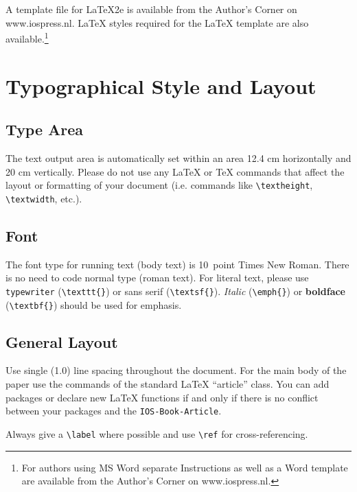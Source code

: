 \documentclass{IOS-Book-Article}
\begin{document}
A template file for \LaTeX2e is available from the Author's Corner on
www.iospress.nl. \LaTeX{} styles required for the \LaTeX{} template are also
available.\footnote{For authors using MS Word separate Instructions as well
as a Word template are available from the Author's Corner on
www.iospress.nl.}

\section{Typographical Style and Layout}

\subsection{Type Area}
The text output area is automatically set within an area 12.4 cm
horizontally and 20 cm vertically. Please do not use any
\LaTeX{} or \TeX{} commands that affect the layout or formatting of
your document (i.e. commands like \verb|\textheight|,
\verb|\textwidth|, etc.).



\subsection{Font}

The font type for running text (body text) is 10~point Times New Roman.
There is no need to code normal type (roman text). For literal text, please use
\texttt{type\-writer} (\verb|\texttt{}|)
or \textsf{sans serif} (\verb|\textsf{}|). \emph{Italic} (\verb|\emph{}|)
or \textbf{boldface} (\verb|\textbf{}|) should be used for emphasis.

\subsection{General Layout}
Use single (1.0) line spacing throughout the document. For the main
body of the paper use the commands of the standard \LaTeX{}
``article'' class. You can add packages or declare new \LaTeX{}
functions if and only if there is no conflict between your packages
and the \texttt{IOS-Book-Article}.

Always give a \verb|\label| where possible and use \verb|\ref| for cross-referencing.
\end{document}

